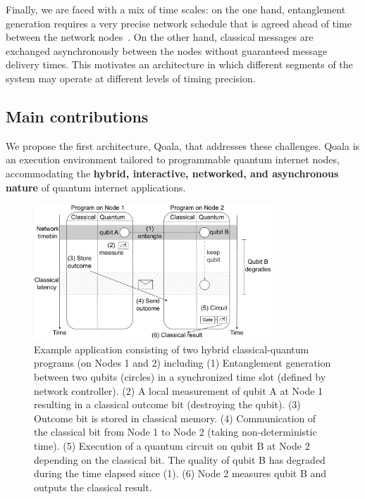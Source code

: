 Finally, we are faced with a mix of time scales:
on the one hand, entanglement generation requires a very precise network schedule that is agreed ahead of time between the network nodes~\cite{dahlberg2019link}. On the other hand, classical messages are exchanged asynchronously between the nodes without guaranteed message delivery times. This motivates an architecture in which different segments of the system may operate at different levels of timing precision. 

\subsection{Main contributions}
We propose the first architecture, Qoala, that addresses these challenges. Qoala is an execution environment tailored to programmable quantum internet nodes, accommodating the \textbf{hybrid, interactive, networked, and asynchronous nature} of quantum internet applications. 

\begin{figure}[t]
    \centering
    \includegraphics[width=0.8\textwidth]{figures/qoala/program_illustration.pdf}
    \caption{Example application consisting of two hybrid classical-quantum programs (on Nodes 1 and 2) including
        (1) Entanglement generation between two qubits (circles) in a synchronized time slot (defined by  network controller).
        (2) A local measurement of qubit A at Node 1 resulting in a classical outcome bit (destroying the qubit).
        (3) Outcome bit is stored in classical memory.
        (4) Communication of the classical bit from Node 1 to Node 2 (taking non-deterministic time).
        (5) Execution of a quantum circuit on qubit B at Node 2 depending on the classical bit. The quality of qubit B has degraded during the time elapsed since (1). 
        (6) Node 2 measures qubit B and outputs the classical result.
    }
    \label{qoala:fig:program_illustration}
\end{figure}

